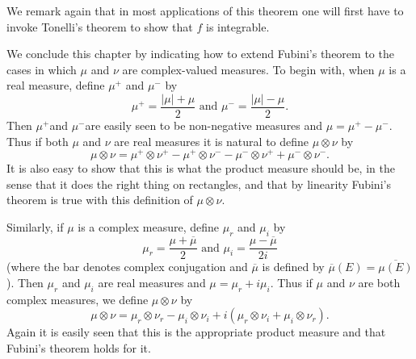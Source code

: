 We remark again that in most applications of this theorem one will first have to invoke Tonelli's theorem to show that $f$ is integrable.

We conclude this chapter by indicating how to extend Fubini's theorem to the cases in which $\mu$ and $\nu$ are complex-valued measures. To begin with, when $\mu$ is a real measure, define $\mu^+$ and $\mu^-$ by \[\mu^+=\frac{|\mu|+\mu}2\text{ and }\mu^-=\frac{|\mu|-\mu}2.\] Then $\mu^+$and $\mu^-$are easily seen to be non-negative measures and $\mu=\mu^+-\mu^-$. Thus if both $\mu$ and $\nu$ are real measures it is natural to define $\mu\otimes\nu$ by \[\mu\otimes\nu=\mu^+\otimes\nu^+-\mu^+\otimes\nu^--\mu^-\otimes\nu^++\mu^-\otimes\nu^-.\] It is also easy to show that this is what the product measure should be, in the sense that it does the right thing on rectangles, and that by linearity Fubini's theorem is true with this definition of $\mu\otimes\nu$.

Similarly, if $\mu$ is a complex measure, define $\mu_r$ and $\mu_i$ by \[\mu_r=\frac{\mu+\overline{\mu}}2\text{ and }\mu_i=\frac{\mu-\overline{\mu}}{2i}\] (where the bar denotes complex conjugation and $\overline{\mu}$ is defined by $\overline{\mu}(E)=\overline{\mu(E)}$). Then $\mu_r$ and $\mu_i$ are real measures and $\mu=\mu_r+i\mu_i$. Thus if $\mu$ and $\nu$ are both complex measures, we define $\mu\otimes\nu$ by \[\mu\otimes\nu=\mu_r\otimes\nu_r-\mu_i\otimes\nu_i+i(\mu_r\otimes\nu_i+\mu_i\otimes\nu_r).\] Again it is easily seen that this is the appropriate product measure and that Fubini's theorem holds for it.